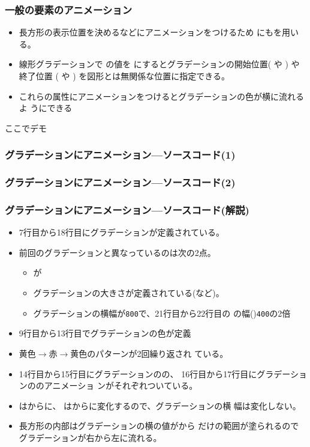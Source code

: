 \begin{frame}[containsverbatim]
 \frametitle{一般の要素のアニメーション}
\begin{itemize}
 \item 長方形の表示位置を決めるなどにアニメーションをつけるため
       にもを用いる。
 \item  線形グラデーションで  の値を 
にするとグラデーションの開始位置( や ) や終了位置
 ( や ) を図形とは無関係な位置に指定できる。
 \item  これらの属性にアニメーションをつけるとグラデーションの色が横に流れるよ
 うにできる
\end{itemize}
 ここでデモ
\end{frame}
\begin{frame}[containsverbatim]
 \frametitle{グラデーションにアニメーション---ソースコード(1)}
\end{frame}
\begin{frame}[containsverbatim]
 \frametitle{グラデーションにアニメーション---ソースコード(2)}
\end{frame}
\begin{frame}[containsverbatim]
 \frametitle{グラデーションにアニメーション---ソースコード(解説)}
 \begin{itemize}
  \item 7行目から18行目にグラデーションが定義されている。
  \item 前回のグラデーションと異なっているのは次の2点。
  \begin{itemize}
   \item {}が
   \item グラデーションの大きさが定義されている(など)。
   \item グラデーションの横幅が\texttt{800}で、21行目から22行目の
         の幅()\texttt{400}の2倍
  \end{itemize}
  \item 9行目から13行目でグラデーションの色が定義
     \item 黄色$\rightarrow$赤$\rightarrow$黄色のパターンが2回繰り返され
           ている。
  \item 14行目から15行目にグラデーションのの、
        16行目から17行目にグラデーションののアニメーショ
        ンがそれぞれついている。
  \item {}はからに、
        はからに変化するので、グラデーションの横
        幅は変化しない。
  \item 長方形の内部はグラデーションの横の値がから
        だけの範囲が塗られるのでグラデーションが右から左に流れる。
 \end{itemize}
\end{frame}
